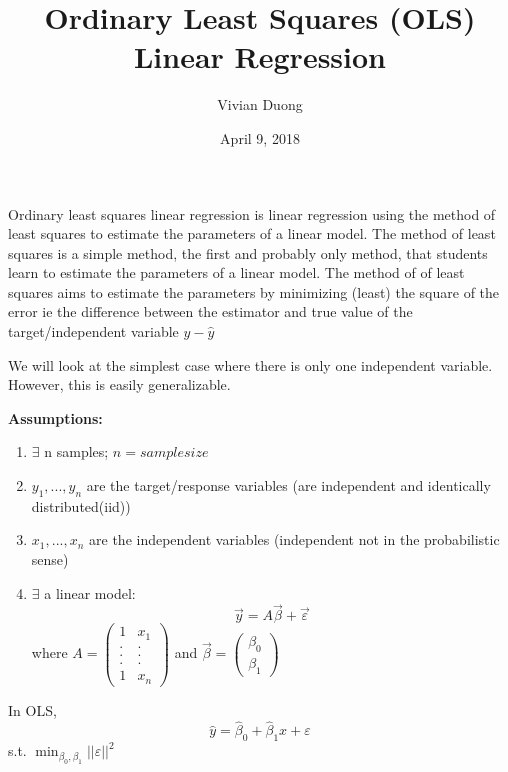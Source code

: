 \documentclass{article}
\title{Ordinary Least Squares (OLS) Linear Regression}
\author{Vivian Duong}
\date{April 9, 2018}
\begin{document}
\maketitle
Ordinary least squares linear regression is linear regression using the method of least squares to estimate the parameters of a linear model. The method of least squares is a simple method, the first and probably only method, that students learn to estimate the parameters of a linear model. \newline
The method of of least squares aims to estimate the parameters by minimizing (least) the square of the error ie the difference between the estimator and true value of the target/independent variable $ y - \hat{y}$

We will look at the simplest case where there is only one independent variable. However, this is easily generalizable.

\textbf{Assumptions:} \newline
\begin{enumerate}
	\item $\exists$ n samples; $n = sample size$
	\item $y_{1}, ..., y_{n}$ are the target/response variables (are independent and identically distributed(iid))
	\item $x_{1}, ..., x_{n}$ are the independent variables (independent not in the probabilistic sense) 
	\item $\exists$ a linear model:  
	\begin{equation} 
	\vec{y} = A\vec{\beta} + \vec{\varepsilon}
	\end{equation}
	\newline
	where $A = \left(\begin{array}{cc} 1 & x_1 \\ . & . \\ . & . \\ . & . \\ 1 & x_n \end{array} \right) $ and $\vec{\beta} = \left(\begin{array}{cc} \beta_0 \\ \beta_1 
	\end{array} \right)$
\end{enumerate}

In OLS,
\begin{equation}
\hat{y} = \hat{\beta}_0 + \hat{\beta}_1x + \varepsilon 
\end{equation}
s.t. $\displaystyle \min_{\beta_0, \beta_1} ||\varepsilon||^2$
\end{document}
